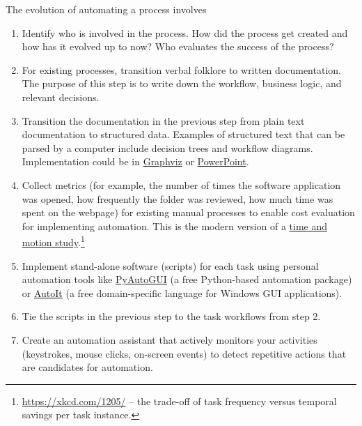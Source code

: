 The evolution of automating a process involves
\begin{enumerate}
    \item Identify who is involved in the process. How did the process get created and how has it evolved up to now? Who evaluates the success of the process? 
    \item For existing processes, transition verbal folklore to written documentation. The purpose of this step is to write down the workflow, business logic, and relevant decisions. 
    \item Transition the documentation in the previous step from plain text documentation to structured data. Examples of structured text that can be parsed by a computer include  decision trees and workflow diagrams. Implementation could be in 
    \href{https://en.wikipedia.org/wiki/Graphviz}{Graphviz} or  \href{https://en.wikipedia.org/wiki/Microsoft_PowerPoint}{PowerPoint}.
    \item Collect metrics (for example, the number of times the software application was opened, how frequently the folder was reviewed, how much time was spent on the webpage) for existing manual processes to enable cost evaluation for implementing automation. This is the modern version of a
    \href{https://en.wikipedia.org/wiki/Time_and_motion_study}{time and motion study}.\footnote{\href{https://xkcd.com/1205/}{https://xkcd.com/1205/} -- the trade-off of task frequency versus temporal savings per task instance.}
    \item Implement stand-alone software (scripts) for each task using personal automation tools like \href{https://pyautogui.readthedocs.io/en/latest/}{PyAutoGUI} (a free Python-based automation package) or \href{https://www.autoitscript.com/site/}{AutoIt} (a free domain-specific language for Windows GUI applications).
    \item Tie the scripts in the previous step to the task workflows from step 2.
    \item Create an automation assistant that actively monitors your activities (keystrokes, mouse clicks, on-screen events) to detect repetitive actions that are candidates for automation.
\end{enumerate}


